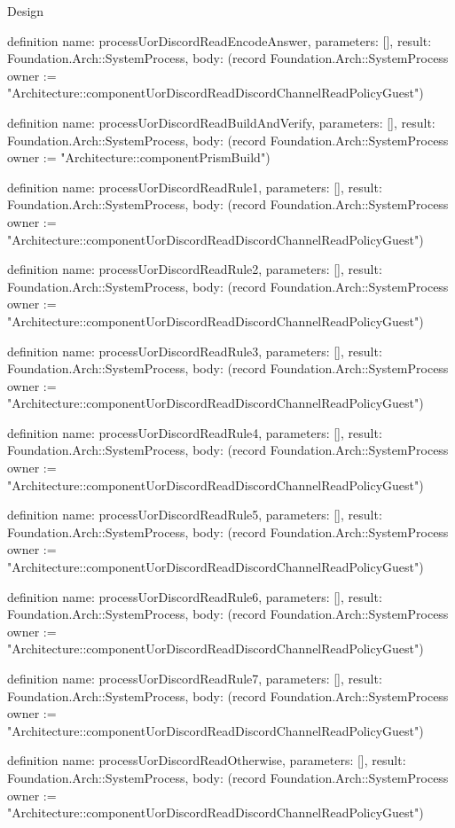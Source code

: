 \begin{lexlean}{Design}
\begin{semanticmodule}
definition{
  name: processUorDiscordReadEncodeAnswer,
  parameters: [],
  result: Foundation.Arch::SystemProcess,
  body: (record Foundation.Arch::SystemProcess {owner := "Architecture::componentUorDiscordReadDiscordChannelReadPolicyGuest"})
}

definition{
  name: processUorDiscordReadBuildAndVerify,
  parameters: [],
  result: Foundation.Arch::SystemProcess,
  body: (record Foundation.Arch::SystemProcess {owner := "Architecture::componentPrismBuild"})
}

definition{
  name: processUorDiscordReadRule1,
  parameters: [],
  result: Foundation.Arch::SystemProcess,
  body: (record Foundation.Arch::SystemProcess {owner := "Architecture::componentUorDiscordReadDiscordChannelReadPolicyGuest"})
}

definition{
  name: processUorDiscordReadRule2,
  parameters: [],
  result: Foundation.Arch::SystemProcess,
  body: (record Foundation.Arch::SystemProcess {owner := "Architecture::componentUorDiscordReadDiscordChannelReadPolicyGuest"})
}

definition{
  name: processUorDiscordReadRule3,
  parameters: [],
  result: Foundation.Arch::SystemProcess,
  body: (record Foundation.Arch::SystemProcess {owner := "Architecture::componentUorDiscordReadDiscordChannelReadPolicyGuest"})
}

definition{
  name: processUorDiscordReadRule4,
  parameters: [],
  result: Foundation.Arch::SystemProcess,
  body: (record Foundation.Arch::SystemProcess {owner := "Architecture::componentUorDiscordReadDiscordChannelReadPolicyGuest"})
}

definition{
  name: processUorDiscordReadRule5,
  parameters: [],
  result: Foundation.Arch::SystemProcess,
  body: (record Foundation.Arch::SystemProcess {owner := "Architecture::componentUorDiscordReadDiscordChannelReadPolicyGuest"})
}

definition{
  name: processUorDiscordReadRule6,
  parameters: [],
  result: Foundation.Arch::SystemProcess,
  body: (record Foundation.Arch::SystemProcess {owner := "Architecture::componentUorDiscordReadDiscordChannelReadPolicyGuest"})
}

definition{
  name: processUorDiscordReadRule7,
  parameters: [],
  result: Foundation.Arch::SystemProcess,
  body: (record Foundation.Arch::SystemProcess {owner := "Architecture::componentUorDiscordReadDiscordChannelReadPolicyGuest"})
}

definition{
  name: processUorDiscordReadOtherwise,
  parameters: [],
  result: Foundation.Arch::SystemProcess,
  body: (record Foundation.Arch::SystemProcess {owner := "Architecture::componentUorDiscordReadDiscordChannelReadPolicyGuest"})
}


\end{semanticmodule}
\end{lexlean}
